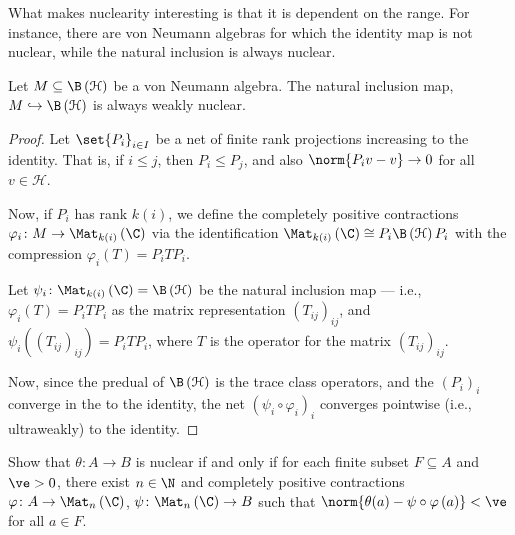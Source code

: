 \documentclass[10pt]{mypackage}
\begin{document}
What makes nuclearity interesting is that it is dependent on the range. For instance, there are von Neumann algebras for which the identity map is not nuclear, while the natural inclusion is always nuclear.
\begin{proposition}
  Let $M\subseteq \B\left( \mathcal{H} \right)$ be a von Neumann algebra. The natural inclusion map, $M\hookrightarrow \B\left( \mathcal{H} \right)$ is always weakly nuclear.
\end{proposition}
\begin{proof}
  Let $\set{P_i}_{i\in I}$ be a net of finite rank projections increasing to the identity. That is, if $i\leq j$, then $P_i\leq P_j$, and also $\norm{P_iv - v}\rightarrow 0$ for all $v\in \mathcal{H}$.\newline

  Now, if $P_i$ has rank $k(i)$, we define the completely positive contractions $\varphi_i\colon M\rightarrow \Mat_{k(i)}\left( \C \right)$ via the identification $\Mat_{k(i)}\left( \C \right) \cong P_i\B\left( \mathcal{H} \right)P_i$ with the compression $\varphi_i(T) = P_iTP_i$.\newline

  Let $\psi_i\colon \Mat_{k(i)}\left( \C \right) = \B\left( \mathcal{H} \right)$ be the natural inclusion map --- i.e., $\varphi_i(T) = P_iTP_i$ as the matrix representation $\left( T_{ij} \right)_{ij}$, and $\psi_i\left( \left( T_{ij} \right)_{ij} \right) = P_iTP_i$, where $T$ is the operator for the matrix $\left( T_{ij} \right)_{ij}$.\newline

  Now, since the predual of $\B\left( \mathcal{H} \right)$ is the trace class operators, and the $\left( P_i \right)_{i}$ converge in the to the identity, the net $\left( \psi_i\circ \varphi_i \right)_i$ converges pointwise (i.e., ultraweakly) to the identity.
\end{proof}
\begin{exercise}[Exercise 2.1.1]
  Show that $\theta\colon A\rightarrow B$ is nuclear if and only if for each finite subset $F\subseteq A$ and $\ve > 0$, there exist $n\in \N$ and completely positive contractions $\varphi\colon A\rightarrow \Mat_n\left( \C \right)$, $\psi\colon \Mat_n\left( \C \right)\rightarrow B$ such that $\norm{\theta(a) - \psi\circ\varphi\left( a \right)} < \ve$ for all $a\in F$.
\end{exercise}
\end{document}
